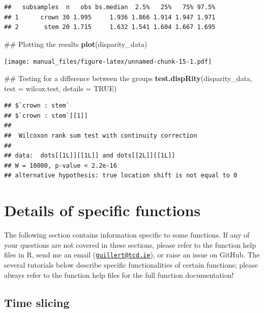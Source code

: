 \documentclass[]{book}
\newenvironment{Shaded}{\begin{snugshade}}{\end{snugshade}}
\newcommand{\KeywordTok}[1]{\textcolor[rgb]{0.13,0.29,0.53}{\textbf{#1}}}
\newcommand{\DataTypeTok}[1]{\textcolor[rgb]{0.13,0.29,0.53}{#1}}
\newcommand{\OtherTok}[1]{\textcolor[rgb]{0.56,0.35,0.01}{#1}}
\newcommand{\NormalTok}[1]{#1}
\theoremstyle{definition}
\theoremstyle{definition}
\theoremstyle{remark}
\begin{document}
\begin{verbatim}
##   subsamples  n   obs bs.median  2.5%   25%   75% 97.5%
## 1      crown 30 1.995     1.936 1.866 1.914 1.947 1.971
## 2       stem 20 1.715     1.632 1.541 1.604 1.667 1.695
\end{verbatim}

\begin{Shaded}
\begin{Highlighting}[]
\NormalTok{## Plotting the results}
\KeywordTok{plot}\NormalTok{(disparity_data)}
\end{Highlighting}
\end{Shaded}

\texttt{[image: manual\_files/figure-latex/unnamed-chunk-15-1.pdf]}

\begin{Shaded}
\begin{Highlighting}[]
\NormalTok{## Testing for a difference between the groups}
\KeywordTok{test.dispRity}\NormalTok{(disparity_data, }\DataTypeTok{test =}\NormalTok{ wilcox.test, }\DataTypeTok{details =} \OtherTok{TRUE}\NormalTok{)}
\end{Highlighting}
\end{Shaded}

\begin{verbatim}
## $`crown : stem`
## $`crown : stem`[[1]]
## 
##  Wilcoxon rank sum test with continuity correction
## 
## data:  dots[[1L]][[1L]] and dots[[2L]][[1L]]
## W = 10000, p-value < 2.2e-16
## alternative hypothesis: true location shift is not equal to 0
\end{verbatim}

\chapter{Details of specific
functions}\label{details-of-specific-functions}

The following section contains information specific to some functions.
If any of your questions are not covered in these sections, please refer
to the function help files in R, send me an email
(\href{mailto:guillert@tcd.ie}{\nolinkurl{guillert@tcd.ie}}), or raise
an issue on GitHub. The several tutorials below describe specific
functionalities of certain functions; please always refer to the
function help files for the full function documentation!

\hypertarget{time-slicing}{\section{Time slicing}\label{time-slicing}}
\end{document}
